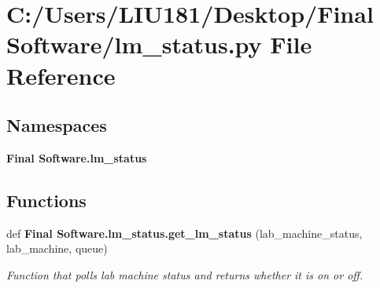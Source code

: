 \section{C\+:/\+Users/\+L\+I\+U181/\+Desktop/\+Final Software/lm\+\_\+status.py File Reference}
\label{lm__status_8py}
\subsection*{Namespaces}
\begin{DoxyCompactItemize}
\item 
 \textbf{ Final Software.\+lm\+\_\+status}
\end{DoxyCompactItemize}
\subsection*{Functions}
\begin{DoxyCompactItemize}
\item 
def \textbf{ Final Software.\+lm\+\_\+status.\+get\+\_\+lm\+\_\+status} (lab\+\_\+machine\+\_\+status, lab\+\_\+machine, queue)
\begin{DoxyCompactList}\small\item\em Function that polls lab machine status and returns whether it is on or off. \end{DoxyCompactList}\end{DoxyCompactItemize}

